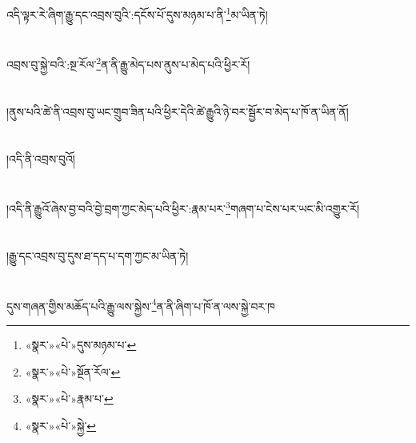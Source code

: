 འདི་ལྟར་རེ་ཞིག་རྒྱུ་དང་འབྲས་བུའི་:དངོས་པོ་དུས་མཉམ་པ་ནི་\footnote{«སྣར་»«པེ་»དུས་མཉམ་པ་}མ་ཡིན་ཏེ།\chapter{ }འབྲས་བུ་སྐྱེ་བའི་:སྔ་རོལ་\footnote{«སྣར་»«པེ་»སྔོན་རོལ་}ན་ནི་རྒྱུ་མེད་པས་ནུས་པ་མེད་པའི་ཕྱིར་རོ།\chapter{ }།ནུས་པའི་ཚེ་ནི་འབྲས་བུ་ཡང་གྲུབ་ཟིན་པའི་ཕྱིར་དེའི་ཚེ་རྒྱུའི་ཉེ་བར་སྦྱོར་བ་མེད་པ་ཁོ་ན་ཡིན་ནོ།\chapter{ }།འདི་ནི་འབྲས་བུའོ།\chapter{ }།འདི་ནི་རྒྱུའོ་ཞེས་བྱ་བའི་བྱེ་བྲག་ཀྱང་མེད་པའི་ཕྱིར་:རྣམ་པར་\footnote{«སྣར་»«པེ་»རྣམ་པ་}གཞག་པ་ངེས་པར་ཡང་མི་འགྱུར་རོ།\chapter{ }།རྒྱུ་དང་འབྲས་བུ་དུས་ཐ་དད་པ་དག་ཀྱང་མ་ཡིན་ཏེ།\chapter{ }དུས་གཞན་གྱིས་མཆོད་པའི་རྒྱུ་ལས་སྐྱེས་\footnote{«སྣར་»«པེ་»སྐྱེ་}ན་ནི་ཞིག་པ་ཁོ་ན་ལས་སྐྱེ་བར་ཁ